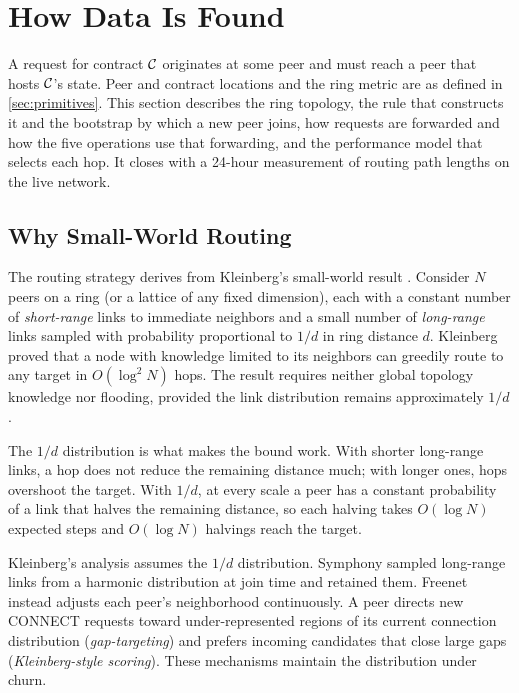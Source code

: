 \section{How Data Is Found}
\label{sec:routing}

A request for contract $\mathcal{C}$ originates at some peer and must reach a peer that hosts $\mathcal{C}$'s state. Peer and contract locations and the ring metric are as defined in \cref{sec:primitives}. This section describes the ring topology, the rule that constructs it and the bootstrap by which a new peer joins, how requests are forwarded and how the five operations use that forwarding, and the performance model that selects each hop. It closes with a 24-hour measurement of routing path lengths on the live network.

\subsection{Why Small-World Routing}
\label{sec:smallworld}

The routing strategy derives from Kleinberg's small-world result \citep{kleinberg2000small}. Consider $N$ peers on a ring (or a lattice of any fixed dimension), each with a constant number of \emph{short-range} links to immediate neighbors and a small number of \emph{long-range} links sampled with probability proportional to $1/d$ in ring distance $d$. Kleinberg proved that a node with knowledge limited to its neighbors can greedily route to any target in $O(\log^2 N)$ hops. The result requires neither global topology knowledge nor flooding, provided the link distribution remains approximately $1/d$.

The $1/d$ distribution is what makes the bound work. With shorter long-range links, a hop does not reduce the remaining distance much; with longer ones, hops overshoot the target. With $1/d$, at every scale a peer has a constant probability of a link that halves the remaining distance, so each halving takes $O(\log N)$ expected steps and $O(\log N)$ halvings reach the target.

Kleinberg's analysis assumes the $1/d$ distribution. Symphony \citep{manku2003symphony} sampled long-range links from a harmonic distribution at join time and retained them. Freenet instead adjusts each peer's neighborhood continuously. A peer directs new \textsf{CONNECT} requests toward under-represented regions of its current connection distribution (\emph{gap-targeting}) and prefers incoming candidates that close large gaps (\emph{Kleinberg-style scoring}). These mechanisms maintain the distribution under churn.

